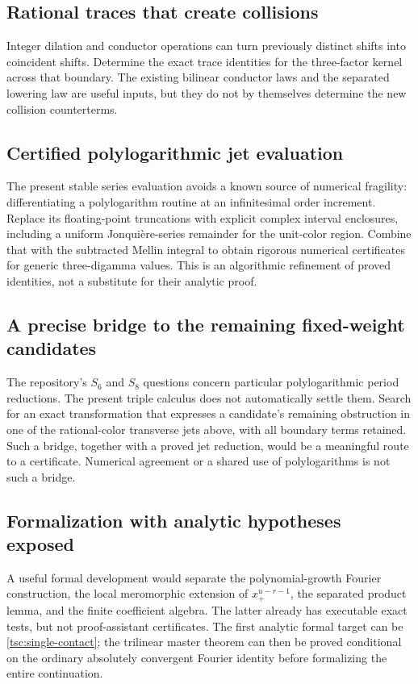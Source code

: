 \subsection{Rational traces that create collisions}
Integer dilation and conductor operations can turn previously distinct
shifts into coincident shifts. Determine the exact trace identities for
the three-factor kernel across that boundary. The existing bilinear
conductor laws and the separated lowering law are useful inputs, but they
do not by themselves determine the new collision counterterms.

\subsection{Certified polylogarithmic jet evaluation}
The present stable series evaluation avoids a known source of numerical
fragility: differentiating a polylogarithm routine at an infinitesimal
order increment. Replace its floating-point truncations with explicit
complex interval enclosures, including a uniform Jonqui\`ere-series
remainder for the unit-color region. Combine that with the subtracted
Mellin integral to obtain rigorous numerical certificates for generic
three-digamma values. This is an algorithmic refinement of proved
identities, not a substitute for their analytic proof.

\subsection{A precise bridge to the remaining fixed-weight candidates}
The repository's $S_6$ and $S_8$ questions concern particular polylogarithmic
period reductions. The present triple calculus does not automatically
settle them. Search for an exact transformation that expresses a candidate's
remaining obstruction in one of the rational-color transverse jets above,
with all boundary terms retained. Such a bridge, together with a proved
jet reduction, would be a meaningful route to a certificate. Numerical
agreement or a shared use of polylogarithms is not such a bridge.

\subsection{Formalization with analytic hypotheses exposed}
A useful formal development would separate the polynomial-growth Fourier
construction, the local meromorphic extension of $x_+^{u-r-1}$, the
separated product lemma, and the finite coefficient algebra. The latter
already has executable exact tests, but not proof-assistant certificates.
The first analytic formal target can be
\eqref{tsc:single-contact}; the trilinear master theorem can then be proved
conditional on the ordinary absolutely convergent Fourier identity before
formalizing the entire continuation.

